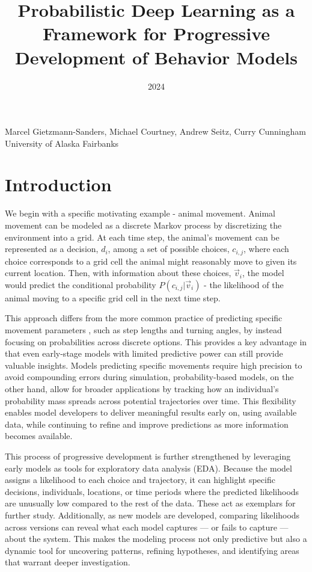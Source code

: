 \documentclass[11pt]{article}
\title{Probabilistic Deep Learning as a Framework for Progressive Development of Behavior Models}
\date{2024}
\makeatletter
\renewcommand{\maketitle}{
\begin{center}

\pagestyle{empty}

{\LARGE \bf \@title\par}
\vspace{1cm}

{\Large Marcel Gietzmann-Sanders, Michael Courtney, Andrew Seitz, Curry Cunningham}\\[1cm]

University of Alaska Fairbanks


\end{center}
}\makeatother
\makeatother
\begin{document}
\maketitle



\section*{Introduction}

We begin with a specific motivating example - animal movement. Animal movement can be modeled as a discrete Markov process by discretizing the environment into a grid. At each time step, the animal's movement can be represented as a decision, $d_i$, among a set of possible choices, $c_{i,j}$, where each choice corresponds to a grid cell the animal might reasonably move to given its current location. Then, with information about these choices, $\vec{v}_{i}$, the model would predict the conditional probability $P(c_{i,j} | \vec{v}_{i})$ - the likelihood of the animal moving to a specific grid cell in the next time step.

This approach differs from the more common practice of predicting specific movement parameters \citep{mlmovement1}, such as step lengths and turning angles, by instead focusing on probabilities across discrete options. This provides a key advantage in that even early-stage models with limited predictive power can still provide valuable insights. Models predicting specific movements require high precision to avoid compounding errors during simulation, probability-based models, on the other hand, allow for broader applications by tracking how an individual's probability mass spreads across potential trajectories over time. This flexibility enables model developers to deliver meaningful results early on, using available data, while continuing to refine and improve predictions as more information becomes available.

This process of progressive development is further strengthened by leveraging early models as tools for exploratory data analysis (EDA). Because the model assigns a likelihood to each choice and trajectory, it can highlight specific decisions, individuals, locations, or time periods where the predicted likelihoods are unusually low compared to the rest of the data. These act as exemplars for further study. Additionally, as new models are developed, comparing likelihoods across versions can reveal what each model captures — or fails to capture — about the system. This makes the modeling process not only predictive but also a dynamic tool for uncovering patterns, refining hypotheses, and identifying areas that warrant deeper investigation.
\end{document}
